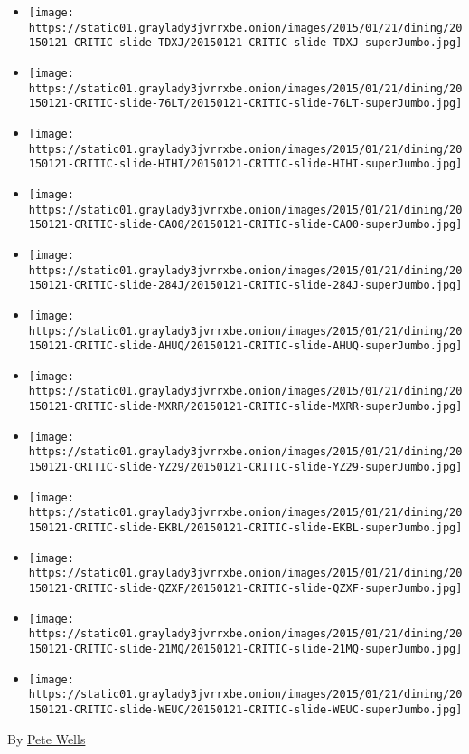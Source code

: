 \begin{itemize}
\item
  \texttt{[image: https://static01.graylady3jvrrxbe.onion/images/2015/01/21/dining/20150121-CRITIC-slide-TDXJ/20150121-CRITIC-slide-TDXJ-superJumbo.jpg]}
\item
  \texttt{[image: https://static01.graylady3jvrrxbe.onion/images/2015/01/21/dining/20150121-CRITIC-slide-76LT/20150121-CRITIC-slide-76LT-superJumbo.jpg]}
\item
  \texttt{[image: https://static01.graylady3jvrrxbe.onion/images/2015/01/21/dining/20150121-CRITIC-slide-HIHI/20150121-CRITIC-slide-HIHI-superJumbo.jpg]}
\item
  \texttt{[image: https://static01.graylady3jvrrxbe.onion/images/2015/01/21/dining/20150121-CRITIC-slide-CAO0/20150121-CRITIC-slide-CAO0-superJumbo.jpg]}
\item
  \texttt{[image: https://static01.graylady3jvrrxbe.onion/images/2015/01/21/dining/20150121-CRITIC-slide-284J/20150121-CRITIC-slide-284J-superJumbo.jpg]}
\item
  \texttt{[image: https://static01.graylady3jvrrxbe.onion/images/2015/01/21/dining/20150121-CRITIC-slide-AHUQ/20150121-CRITIC-slide-AHUQ-superJumbo.jpg]}
\item
  \texttt{[image: https://static01.graylady3jvrrxbe.onion/images/2015/01/21/dining/20150121-CRITIC-slide-MXRR/20150121-CRITIC-slide-MXRR-superJumbo.jpg]}
\item
  \texttt{[image: https://static01.graylady3jvrrxbe.onion/images/2015/01/21/dining/20150121-CRITIC-slide-YZ29/20150121-CRITIC-slide-YZ29-superJumbo.jpg]}
\item
  \texttt{[image: https://static01.graylady3jvrrxbe.onion/images/2015/01/21/dining/20150121-CRITIC-slide-EKBL/20150121-CRITIC-slide-EKBL-superJumbo.jpg]}
\item
  \texttt{[image: https://static01.graylady3jvrrxbe.onion/images/2015/01/21/dining/20150121-CRITIC-slide-QZXF/20150121-CRITIC-slide-QZXF-superJumbo.jpg]}
\item
  \texttt{[image: https://static01.graylady3jvrrxbe.onion/images/2015/01/21/dining/20150121-CRITIC-slide-21MQ/20150121-CRITIC-slide-21MQ-superJumbo.jpg]}
\item
  \texttt{[image: https://static01.graylady3jvrrxbe.onion/images/2015/01/21/dining/20150121-CRITIC-slide-WEUC/20150121-CRITIC-slide-WEUC-superJumbo.jpg]}
\end{itemize}

By \href{http://www.nytimes3xbfgragh.onion/by/pete-wells}{Pete Wells}

